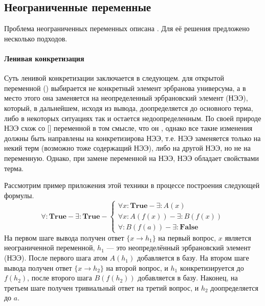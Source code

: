 \subsection{Неограниченные переменные}
Проблема неограниченных переменных описана . Для её решения предложено несколько подходов.

\paragraph{Ленивая конкретизация}
Суть ленивой конкретизации заключается в следующем.  для открытой переменной () выбирается не конкретный элемент эрбранова универсума, а в место этого она заменяется на неопределенный эрбрановский элемент (НЭЭ), который, в дальнейшем, исходя из  вывода,  доопределяется до основного терма, либо в некоторых ситуациях так и остается недоопределенным. По своей природе НЭЭ схож со [] переменной в том смысле, что он , однако все такие изменения должны быть направлены  на конкретизирова НЭЭ, т.е. НЭЭ заменяется только на некий терм (возможно тоже содержащий НЭЭ), либо на другой НЭЭ, но не на переменную. Однако, при замене переменной на НЭЭ, НЭЭ обладает  свойствами терма.

Рассмотрим пример приложения этой техники в процессе построения  следующей формулы.
\begin{equation}
	\forall\colon\boldsymbol{True} - \exists\colon\boldsymbol{True} -
	\left\lbrace
	\begin{array}{l}
		\forall x\colon\boldsymbol{True} - \exists\colon A(x) \\
		\forall x\colon A(f(x)) - \exists\colon B(f(x)) \\
		\forall\colon B(f(a)) - \exists\colon \boldsymbol{False}
	\end{array}\right.
\end{equation}
На первом шаге вывода получен ответ $\{x \rightarrow h_1\}$ на первый вопрос, $x$ является неограниченной переменной, $h_1$ --- это неопределённый эрбрановский элемент (НЭЭ). После первого шага атом $A(h_1)$ добавляется в базу. На втором шаге вывода получен ответ $\{x \rightarrow h_2\}$ на второй вопрос, и $h_1$ конкретизируется до $f(h_2)$, после второго шага $B(f(h_2))$ добавляется в базу. Наконец, на третьем шаге получен тривиальный ответ на третий вопрос, и $h_2$ доопределяется до $a$.

